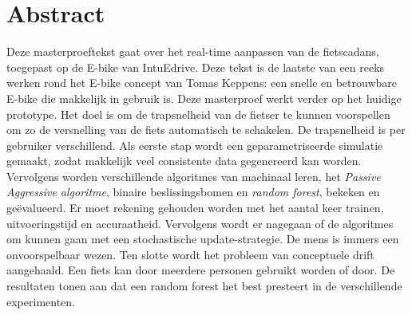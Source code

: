\documentclass[12pt,a4paper,oneside]{book}
\makeatletter
\renewcommand{\algorithmcfname}{Algoritme}
\newcommand{\RemoveAlgoNumber}{\renewcommand{\fnum@algocf}{\AlCapSty{\AlCapFnt\algorithmcfname}}}
\makeatother
\begin{document}
\chapter{Abstract}
Deze masterproeftekst gaat over het real-time aanpassen van de fietscadans, toegepast op de E-bike van IntuEdrive. Deze tekst is de laatste van een reeks werken rond het E-bike concept van Tomas Keppens: een snelle en betrouwbare E-bike die makkelijk in gebruik is. Deze masterproef werkt verder op het huidige prototype. Het doel is om de trapsnelheid van de fietser te kunnen voorspellen om zo de versnelling van de fiets automatisch te schakelen. De trapsnelheid is per gebruiker verschillend. Als eerste stap wordt een geparametriseerde simulatie gemaakt, zodat makkelijk veel consistente data gegenereerd kan worden. Vervolgens worden verschillende algoritmes van machinaal leren, het \textit{Passive Aggressive algoritme}, binaire beslissingsbomen en \textit{random forest}, bekeken en geëvalueerd. Er moet rekening gehouden worden met het aantal keer trainen, uitvoeringstijd en accuraatheid. Vervolgens wordt er nagegaan of de algoritmes om kunnen gaan met een stochastische update-strategie. De mens is immers een onvoorspelbaar wezen. Ten slotte wordt het probleem van conceptuele drift aangehaald. Een fiets kan door meerdere personen gebruikt worden of door. De resultaten tonen aan dat een random forest het best presteert in de verschillende experimenten.

\tableofcontents
\newpage
\listoffigures
{}
\listoftables
{}
\newpage
\printglossary[type=\acronymtype ,title=Lijst van afkortingen ,style=mystyle]
\newpage
{}
\printglossary[title=Lijst van symbolen,style=mystyle]

\mainmatter
{}
\RemoveAlgoNumber







\end{document}
